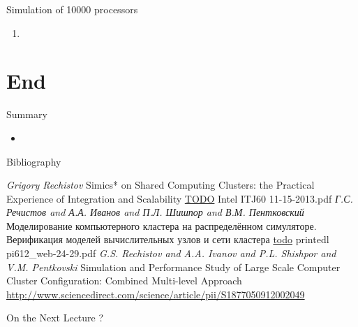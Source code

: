 \begin{frame}{Simulation of 10000 processors}


\begin{enumerate}
    \item 
\end{enumerate}

\end{frame}


\section{End}

\begin{frame}{Summary}
\begin{itemize}
\item 
\end{itemize}
\end{frame}

\begin{frame}[allowframebreaks]{Bibliography}
\begin{thebibliography}{99}
   \textit{Grigory Rechistov} Simics* on Shared Computing Clusters: the Practical Experience of Integration and Scalability \url{TODO} Intel ITJ60 11-15-2013.pdf
   \textit{Г.С. Речистов and А.А. Иванов and П.Л. Шишпор and В.М. Пентковский} Моделирование компьютерного кластера на распределённом симуляторе. Верификация моделей вычислительных узлов и сети кластера \url{todo} printedl pi612_web-24-29.pdf
   \textit{G.S. Rechistov and A.A. Ivanov and P.L. Shishpor and V.M. Pentkovski} Simulation and Performance Study of Large Scale Computer Cluster Configuration: Combined Multi-level Approach \url{http://www.sciencedirect.com/science/article/pii/S1877050912002049}  

\end{thebibliography}
\end{frame}

\begin{frame}{On the Next Lecture}
?
\end{frame}

\finalslide


